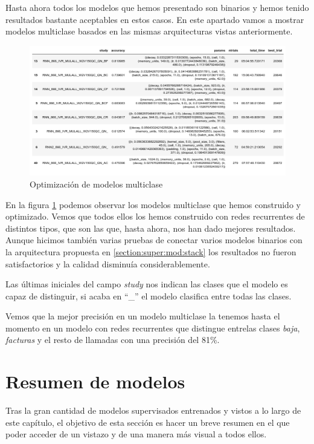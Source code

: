Hasta ahora todos los modelos que hemos presentado son binarios y hemos tenido resultados bastante aceptables en estos casos. En este apartado vamos a mostrar modelos multiclase basados en las mismas arquitecturas vistas anteriormente.



\begin{figure}[!ht]
	\centering
	\includegraphics[width=1\textwidth]{images/super/opt_multi}
	\caption{Optimización de modelos multiclase}
	\label{fig:opt_multi}
\end{figure}

En la figura \ref{fig:opt_multi} podemos observar  los modelos multiclase que hemos construido y optimizado. Vemos que todos ellos los hemos construido con redes recurrentes de distintos tipos, que son las que, hasta ahora, nos han dado mejores resultados.  Aunque hicimos también  varias pruebas de conectar varios modelos binarios con la arquitectura propuesta en \ref{section:super:mod:stack} los resultados no fueron satisfactorios y la calidad disminuía considerablemente. 


Las últimas iniciales del campo \textit{study} nos indican las clases que el modelo es capaz de distinguir, si acaba en ``\_'' el modelo clasifica entre todas las clases.

Vemos que la mejor precisión en un modelo multiclase la tenemos hasta el momento en un modelo con redes recurrentes que distingue entrelas clases \textit{baja}, \textit{facturas} y el resto de llamadas con una precisión del 81\%.



\section{Resumen de modelos}
\label{section:super:resumen}

Tras la gran cantidad de modelos supervisados entrenados y vistos a lo largo de este capítulo, el objetivo de esta sección es hacer un breve resumen en el que poder acceder de un vistazo y de una manera más visual a todos ellos. 


